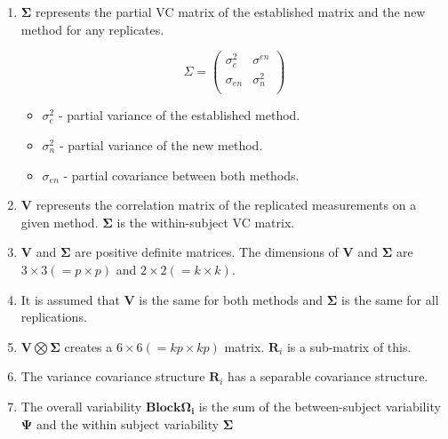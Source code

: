 \documentclass[12pt, a4paper]{article}
\begin{document}
\begin{enumerate}
\item  $\boldsymbol{\Sigma}$ represents the partial VC matrix of
the established matrix and the new method for any replicates.

\begin{equation}
\Sigma = \left( \begin{array}{cc}
  \sigma^2_{e} & \sigma^{en} \\
  \sigma_{en} & \sigma^2_{n} \\
\end{array}\right)
\end{equation}

\begin{itemize}
\item $\sigma^2_{e}$ - partial variance of the established method.
\item $\sigma^2_{n}$ - partial variance of the new method.
\item $\sigma_{en}$ - partial covariance between both methods.
\end{itemize}

\item $\boldsymbol{V}$ represents the correlation matrix of the replicated measurements on a given method.
$\boldsymbol{\Sigma}$ is the within-subject VC matrix.

\item $\boldsymbol{V}$ and $\boldsymbol{\Sigma}$ are positive
definite matrices. The dimensions of $\boldsymbol{V}$ and
$\boldsymbol{\Sigma}$ are $3 \times 3 ( = p \times p )$ and $ 2 \times
2 (= k \times k)$.

\item It is assumed that $\boldsymbol{V}$ is the same for both methods and $\boldsymbol{\Sigma}$ is
the same for all replications.

\item $\boldsymbol{V} \bigotimes \boldsymbol{\Sigma}$ creates a $ 6 \times 6 ( = kp \times
kp)$ matrix.
$\boldsymbol{R}_{i}$ is a sub-matrix of this.

\item The variance covariance structure $\boldsymbol{R}_{i}$ has a separable covariance structure.

\item The overall variability $\boldsymbol{\mbox{Block} \Omega_{i}}$ is the sum of the
between-subject variability $\boldsymbol{\Psi}$
and the within subject variability $\boldsymbol{\Sigma}$


\end{enumerate}
\end{document}
